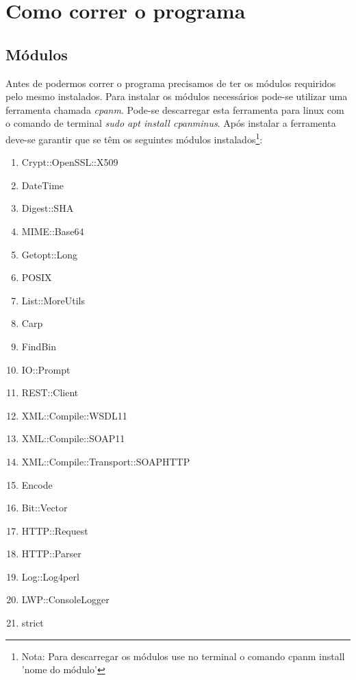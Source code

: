 \section{Como correr o programa}

\subsection{Módulos}
\par Antes de podermos correr o programa precisamos de ter os módulos requiridos pelo mesmo instalados. Para instalar os módulos necessários pode-se utilizar uma ferramenta chamada \textit{cpanm}\cite{cpanm}. Pode-se descarregar esta ferramenta para linux com o comando de terminal \textit{sudo apt install cpanminus}.\newline
Após instalar a ferramenta deve-se garantir que se têm os seguintes módulos instalados\footnote{Nota: Para descarregar os módulos use no terminal o comando cpanm install 'nome do módulo'}:

\begin{enumerate}
	\item Crypt::OpenSSL::X509
	\item DateTime
	\item Digest::SHA
	\item MIME::Base64
	\item Getopt::Long
	\item POSIX
	\item List::MoreUtils
	\item Carp
	\item FindBin
	\item IO::Prompt
	\item REST::Client
	\item XML::Compile::WSDL11
	\item XML::Compile::SOAP11
	\item XML::Compile::Transport::SOAPHTTP
	\item Encode
	\item Bit::Vector
	\item HTTP::Request
	\item HTTP::Parser
	\item Log::Log4perl
	\item LWP::ConsoleLogger
	\item strict
\end{enumerate}

